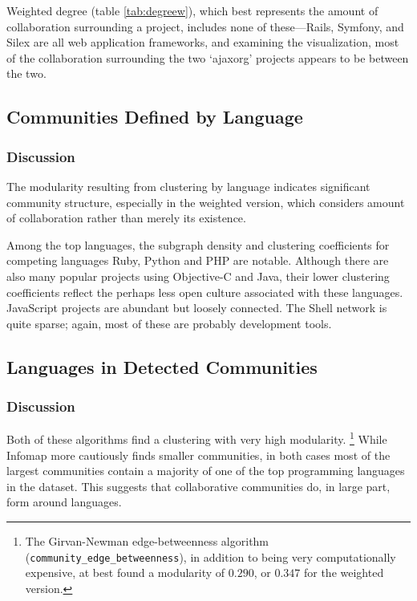 \documentclass[11pt]{article}
\begin{document}
Weighted degree (table \ref{tab:degreew}), which best represents the amount of
collaboration surrounding a project, includes none of these---Rails, Symfony,
and Silex are all web application frameworks, and examining the visualization,
most of the collaboration surrounding the two `ajaxorg' projects appears to be
between the two.

\subsection{Communities Defined by Language}



\subsubsection{Discussion}
The modularity resulting from clustering by language indicates significant
community structure, especially in the weighted version, which considers amount
of collaboration rather than merely its existence.

Among the top languages, the subgraph density and clustering coefficients for
competing languages Ruby, Python and PHP are notable. Although there are also
many popular projects using Objective-C and Java, their lower clustering
coefficients reflect the perhaps less open culture associated with these
languages. JavaScript projects are abundant but loosely connected. The Shell
network is quite sparse; again, most of these are probably development tools. 

\subsection{Languages in Detected Communities}



\subsubsection{Discussion}
Both of these algorithms find a clustering with very high modularity.
\footnote{The Girvan-Newman edge-betweenness algorithm
(\texttt{community\_edge\_betweenness}), in addition to being very
computationally expensive, at best found a modularity of $0.290$, or $0.347$ for
the weighted version.} While Infomap more cautiously finds smaller communities,
in both cases most of the largest communities contain a majority of one of the
top programming languages in the dataset. This suggests that collaborative
communities do, in large part, form around languages.
\end{document}
